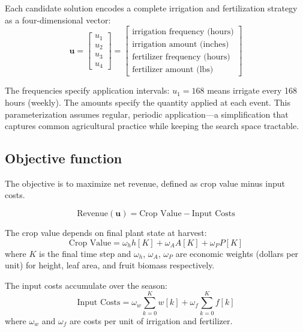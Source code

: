 \documentclass[preprint,12pt]{elsarticle}
\begin{document}
Each candidate solution encodes a complete irrigation and fertilization strategy as a four-dimensional vector:
\begin{equation}
\mathbf{u} = \begin{bmatrix} u_{1} \\ u_{2} \\ u_{3} \\ u_{4} \end{bmatrix} = \begin{bmatrix} \text{irrigation frequency (hours)} \\ \text{irrigation amount (inches)} \\ \text{fertilizer frequency (hours)} \\ \text{fertilizer amount (lbs)} \end{bmatrix}
\label{eqn:design-vars}
\end{equation}

The frequencies specify application intervals: $u_{1} = 168$ means irrigate every 168 hours (weekly). The amounts specify the quantity applied at each event. This parameterization assumes regular, periodic application---a simplification that captures common agricultural practice while keeping the search space tractable.

\subsection{Objective function}\label{subsec:objective}

The objective is to maximize net revenue, defined as crop value minus input costs.

\begin{equation}
\text{Revenue}(\mathbf{u}) = \text{Crop Value} - \text{Input Costs}
\label{eqn:cost-function}
\end{equation}

The crop value depends on final plant state at harvest:
\begin{equation}
\text{Crop Value} = \omega_{h}h[K] + \omega_{A}A[K] + \omega_{P}P[K]
\label{eqn:crop-value}
\end{equation}
where $K$ is the final time step and $\omega_{h}$, $\omega_{A}$, $\omega_{P}$ are economic weights (dollars per unit) for height, leaf area, and fruit biomass respectively.

The input costs accumulate over the season:
\begin{equation}
\text{Input Costs} = \omega_{w}\sum_{k=0}^{K}w[k] + \omega_{f}\sum_{k=0}^{K}f[k]
\label{eqn:input-costs}
\end{equation}
where $\omega_{w}$ and $\omega_{f}$ are costs per unit of irrigation and fertilizer.
\end{document}
